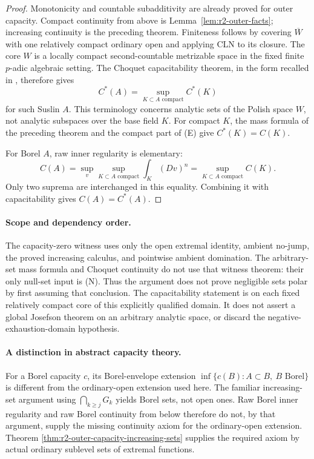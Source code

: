 \documentclass[11pt,a4paper]{article}
\numberwithin{equation}{section}
\theoremstyle{definition}
\theoremstyle{remark}
\begin{document}
\begin{proof}
Monotonicity and countable subadditivity are already proved for
outer capacity. Compact continuity from above is
Lemma~\ref{lem:r2-outer-facts}; increasing continuity is the preceding
theorem. Finiteness follows by covering $\overline W$ with one
relatively compact ordinary open and applying CLN to its closure.
The core $W$ is a locally compact second-countable metrizable space
in the fixed finite $p$-adic algebraic setting. The Choquet
capacitability theorem, in the form recalled in
\cite[\S8, following Theorem 8.2]{BT82}, therefore gives
\[
 C^*(A)=\sup_{K\subset A\text{ compact}}C^*(K)
\]
for such Suslin $A$. This terminology concerns analytic sets of the
Polish space $W$, not analytic subspaces over the base field $K$.
For compact $K$, the mass formula of the
preceding theorem and the compact part of \textup{(E)} give
$C^*(K)=C(K)$.

For Borel $A$, raw inner regularity is elementary:
\[
 C(A)=\sup_{v}\sup_{K\subset A\text{ compact}}
       \int_K(Dv)^n
     =\sup_{K\subset A\text{ compact}}C(K).
\]
Only two suprema are interchanged in this equality. Combining it
with capacitability gives $C(A)=C^*(A)$.
\end{proof}

\paragraph{Scope and dependency order.}
The capacity-zero witness uses only the open extremal identity,
ambient no-jump, the proved increasing calculus, and pointwise
ambient domination. The arbitrary-set mass formula and Choquet
continuity do not use that witness theorem: their only null-set
input is \textup{(N)}. Thus the argument does not prove negligible
sets polar by first assuming that conclusion. The capacitability
statement is on each fixed relatively compact core of this explicitly
qualified domain. It does not assert a global Josefson theorem on an
arbitrary analytic space, or discard the negative-exhaustion-domain
hypothesis.

\paragraph{A distinction in abstract capacity theory.}
For a Borel capacity $c$, its Borel-envelope extension
$\inf\{c(B): A\subset B,\ B\text{ Borel}\}$ is different from
the ordinary-open extension used here. The familiar increasing-set
argument using $\bigcap_{k\geq j}G_k$ yields Borel sets, not open
ones. Raw Borel inner regularity and raw Borel continuity from below
therefore do not, by that argument, supply the missing continuity
axiom for the ordinary-open extension. Theorem
\ref{thm:r2-outer-capacity-increasing-sets} supplies the required
axiom by actual ordinary sublevel sets of extremal functions.
\end{document}
